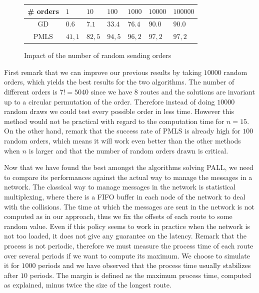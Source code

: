 \documentclass[10pt, conference, letterpaper]{IEEEtran}
\begin{document}
         \begin{figure}[H] 
       \begin{center}
   \begin{tabularx}{0.5\textwidth}{|c|X|X|X|X|X|X|}
    \hline
    \# orders& $1$ & $10$ & $100$& $1 000$& $10 000$&$100 000$\\
    \hline
    GD & $0.6$ &$7.1$&$33.4$&$76.4$&$90.0$&$90.0$\\
    \hline
  PMLS & $41,1$ &$82,5$&$94,5$&$96,2$&$97,2$&$97,2$\\
    \hline
      \end{tabularx}
      \end{center}
   \caption{Impact of the number of random sending orders}
     \end{figure}
     
First remark that we can improve our previous results by taking $10000$ random orders, which 
yields the best results for the two algorithms. The number of different orders is $7!= 5040$ since we have $8$ routes and the solutions are invariant up to a circular permutation of the order. Therefore instead of doing $10000$ random draws we could test every possible order in less time. However this method would not be practical with regard to the computation time for $n = 15$. On the other hand, remark that the success rate of PMLS is already high for $100$ random orders, which means it will work even better than the other methods when $n$ is larger and that the number of random orders drawn is critical.
     
     
     
     Now that we have found the best amongst the algorithms solving PALL, we need to compare its performances against the actual way to manage the messages in a network. The classical way to manage messages in the network is statistical multiplexing, where there is a FIFO buffer in each node of the network to deal with the collisions. The time at which the messages are sent in the network is not computed as in our approach, thus we fix the offsets of each route to some random value.
     Even if this policy seems to work in practice when the network is not too loaded, it does not give any guarantee on the latency. Remark that the process is not periodic, therefore we must measure the process time of each route over several periods if we want to compute its maximum. We choose to simulate it for $1000$ periods and we have observed that the process time usually stabilizes after $10$ periods. The margin is defined as the maximum process time, computed as explained, minus twice the size of the longest route. 
	    
\end{document}
